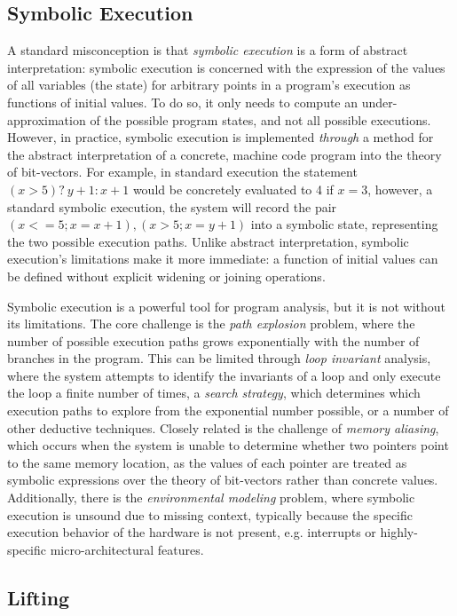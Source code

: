 \subsection{Symbolic Execution}

A standard misconception is that \emph{symbolic execution} is a form of abstract interpretation: symbolic execution is concerned with the expression of the values of all variables (the state) for arbitrary points in a program's execution as functions of initial values.
To do so, it only needs to compute an under-approximation of the possible program states, and not all possible executions.
However, in practice, symbolic execution is implemented \emph{through} a method for the abstract interpretation of a concrete, machine code program into the theory of bit-vectors.
For example, in standard execution the statement $(x > 5) ?\ y + 1 : x + 1$ would be concretely evaluated to 4 if $x = 3$, however, a standard symbolic execution, the system will record the pair $(x<=5; x=x+1),(x>5;x=y+1)$ into a symbolic state, representing the two possible execution paths.
Unlike abstract interpretation, symbolic execution's limitations make it more immediate: a function of initial values can be defined without explicit widening or joining operations.

Symbolic execution is a powerful tool for program analysis, but it is not without its limitations.
The core challenge is the \emph{path explosion} problem, where the number of possible execution paths grows exponentially with the number of branches in the program.
This can be limited through \emph{loop invariant} analysis, where the system attempts to identify the invariants of a loop and only execute the loop a finite number of times, a \emph{search strategy}, which determines which execution paths to explore from the exponential number possible, or a number of other deductive techniques.
Closely related is the challenge of \emph{memory aliasing}, which occurs when the system is unable to determine whether two pointers point to the same memory location, as the values of each pointer are treated as symbolic expressions over the theory of bit-vectors rather than concrete values.
Additionally, there is the \emph{environmental modeling} problem, where symbolic execution is unsound due to missing context, typically because the specific execution behavior of the hardware is not present, e.g. interrupts or highly-specific micro-architectural features.

\subsection{Lifting}
\label{ref:lifting-prelim}

